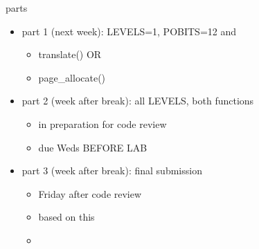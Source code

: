 \begin{frame}{parts}
    \begin{itemize}
    \item part 1 (next week): LEVELS=1, POBITS=12 and
        \begin{itemize}
        \item translate() OR
        \item page\_allocate()
        \end{itemize}
    \item part 2 (week after break): all LEVELS, both functions
        \begin{itemize}
        \item in preparation for code review
        \item due Weds BEFORE LAB
        \end{itemize}
    \item part 3 (week after break): final submission
        \begin{itemize}
        \item Friday after code review
        \item {} based on this
        \item {}
        \end{itemize}
    \end{itemize}
\end{frame}
